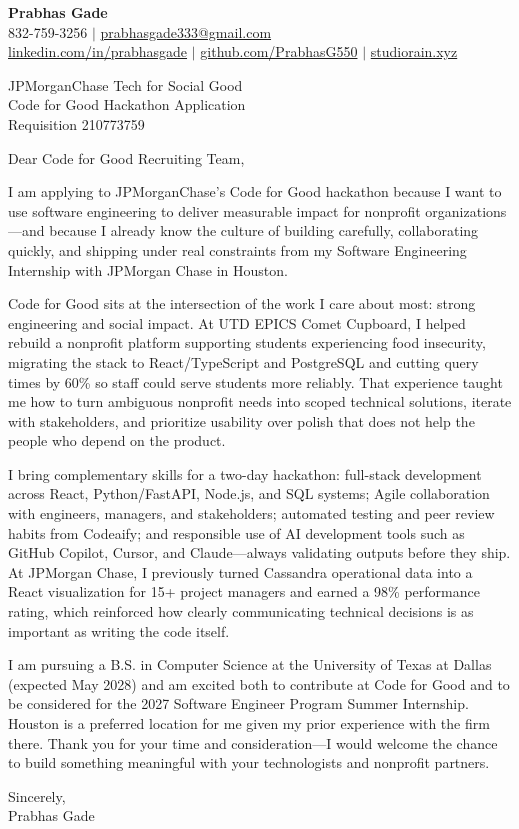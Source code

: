 \documentclass[letterpaper,11pt]{letter}
\begin{document}
\begin{flushleft}
\textbf{\large Prabhas Gade}\\
832-759-3256 $|$ \href{mailto:prabhasgade333@gmail.com}{prabhasgade333@gmail.com}\\
\href{https://linkedin.com/in/prabhasgade}{linkedin.com/in/prabhasgade} $|$
\href{https://github.com/PrabhasG550}{github.com/PrabhasG550} $|$
\href{https://studiorain.xyz}{studiorain.xyz}
\end{flushleft}

\vspace{6pt}
\begin{flushleft}
JPMorganChase Tech for Social Good\\
Code for Good Hackathon Application\\
Requisition 210773759
\end{flushleft}

Dear Code for Good Recruiting Team,

I am applying to JPMorganChase's Code for Good hackathon because I want to use software engineering to deliver measurable impact for nonprofit organizations---and because I already know the culture of building carefully, collaborating quickly, and shipping under real constraints from my Software Engineering Internship with JPMorgan Chase in Houston.

Code for Good sits at the intersection of the work I care about most: strong engineering and social impact. At UTD EPICS Comet Cupboard, I helped rebuild a nonprofit platform supporting students experiencing food insecurity, migrating the stack to React/TypeScript and PostgreSQL and cutting query times by 60\% so staff could serve students more reliably. That experience taught me how to turn ambiguous nonprofit needs into scoped technical solutions, iterate with stakeholders, and prioritize usability over polish that does not help the people who depend on the product.

I bring complementary skills for a two-day hackathon: full-stack development across React, Python/FastAPI, Node.js, and SQL systems; Agile collaboration with engineers, managers, and stakeholders; automated testing and peer review habits from Codeaify; and responsible use of AI development tools such as GitHub Copilot, Cursor, and Claude---always validating outputs before they ship. At JPMorgan Chase, I previously turned Cassandra operational data into a React visualization for 15+ project managers and earned a 98\% performance rating, which reinforced how clearly communicating technical decisions is as important as writing the code itself.

I am pursuing a B.S. in Computer Science at the University of Texas at Dallas (expected May 2028) and am excited both to contribute at Code for Good and to be considered for the 2027 Software Engineer Program Summer Internship. Houston is a preferred location for me given my prior experience with the firm there. Thank you for your time and consideration---I would welcome the chance to build something meaningful with your technologists and nonprofit partners.

Sincerely,\\
Prabhas Gade
\end{document}
